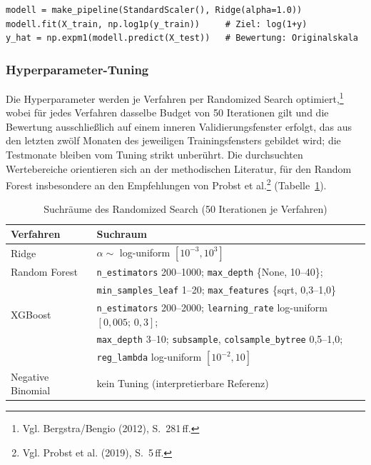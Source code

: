 \begin{lstlisting}[caption={Log-lineare Ridge-Pipeline mit
trainingsfensterinterner Standardisierung}, label=lst:ridge]
modell = make_pipeline(StandardScaler(), Ridge(alpha=1.0))
modell.fit(X_train, np.log1p(y_train))     # Ziel: log(1+y)
y_hat = np.expm1(modell.predict(X_test))   # Bewertung: Originalskala
\end{lstlisting}

\subsubsection{Hyperparameter-Tuning}

Die Hyperparameter werden je Verfahren per Randomized Search
optimiert,\footnote{Vgl. Bergstra/Bengio (2012), S.~281\,ff.} wobei für
jedes Verfahren dasselbe Budget von 50 Iterationen gilt und die Bewertung
ausschließlich auf einem inneren Validierungsfenster erfolgt, das aus den
letzten zwölf Monaten des jeweiligen Trainingsfensters gebildet wird; die
Testmonate bleiben vom Tuning strikt unberührt. Die durchsuchten
Wertebereiche orientieren sich an der methodischen Literatur, für den Random
Forest insbesondere an den Empfehlungen von Probst et
al.\footnote{Vgl. Probst et al. (2019), S.~5\,ff.}
(Tabelle~\ref{tab:suchraeume}).

\begin{table}[htbp]
  \centering
  \caption{Suchräume des Randomized Search (50 Iterationen je Verfahren)}
  \label{tab:suchraeume}
  \begin{tabular}{ll}
    \hline
    \textbf{Verfahren} & \textbf{Suchraum} \\
    \hline
    Ridge & $\alpha \sim$ log-uniform $[10^{-3}, 10^{3}]$ \\
    Random Forest & \texttt{n\_estimators} 200--1000; \texttt{max\_depth}
      \{None, 10--40\}; \\
      & \texttt{min\_samples\_leaf} 1--20; \texttt{max\_features}
      \{sqrt, 0{,}3--1{,}0\} \\
    XGBoost & \texttt{n\_estimators} 200--2000; \texttt{learning\_rate}
      log-uniform $[0{,}005;\,0{,}3]$; \\
      & \texttt{max\_depth} 3--10; \texttt{subsample},
      \texttt{colsample\_bytree} 0{,}5--1{,}0; \\
      & \texttt{reg\_lambda} log-uniform $[10^{-2}, 10]$ \\
    Negative Binomial & kein Tuning (interpretierbare Referenz) \\
    \hline
  \end{tabular}
\end{table}

